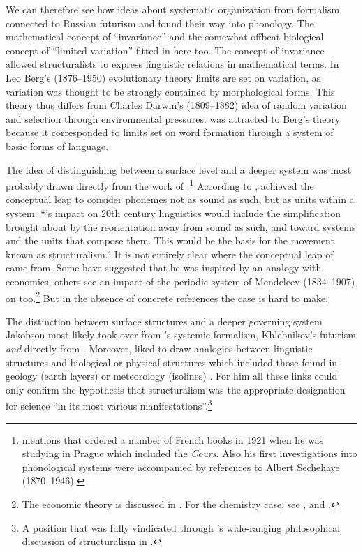 \documentclass[output=paper]{langscibook}
\begin{document}
We can therefore see how ideas about systematic organization from formalism connected to Russian futurism and found their way into  phonology. The mathematical concept of ``invariance'' and the somewhat offbeat biological concept of ``limited variation'' fitted in here too. The concept of invariance allowed structuralists to express linguistic relations in mathematical terms. In Leo Berg's (1876--1950) evolutionary theory limits are set on variation, as variation was thought to be strongly contained by morphological forms. This theory thus differs from Charles Darwin's (1809--1882) idea of random variation and selection through environmental pressures. {\Jakobson} was attracted to Berg's theory because it corresponded to limits set on word formation through a system of basic forms of language.

The idea of distinguishing between a surface level and a deeper system was most probably drawn directly from the work of {\Saussure}.\footnote{\citet[88--94]{Toman1995} mentions that {\Jakobson} ordered a number of French books in 1921 when he was studying in Prague which included the \emph{Cours}. Also his first investigations into phonological systems were accompanied by references to Albert Sechehaye (1870--1946).} According to \citet[237]{Joseph2010}, {\Saussure} achieved the conceptual leap to consider phonemes not as sound as such, but as units within a system: ``{\Saussure}'s impact on 20th century linguistics would include the simplification brought about by the reorientation away from sound as such, and toward systems and the units that compose them. This would be the basis for the movement known as structuralism.” It is not entirely clear where the conceptual leap of {\Saussure} came from. Some have suggested that he was inspired by an analogy with economics, others see an impact of the periodic system of Mendeleev (1834--1907) on {\Saussure} too.\footnote{The economic theory is discussed in \citet{Joseph2014}. For the chemistry case, see \citet{Culler1976}, \citet{Clark2008} and \citet{Silverstein2016}.} But in the absence of concrete references the case is hard to make. 


The distinction between surface structures and a deeper governing system Ja\-kob\-son most likely took over from {\Tynjanov}'s systemic formalism, Khleb\-ni\-kov's futurism \emph{and} directly from {\Saussure}.
Moreover, {\Jakobson} liked to draw analogies between linguistic structures and biological or physical structures which included those found in geology (earth layers) or meteorology (isolines) \citep[see][74--74, 188--194]{Holenstein1975}. For him all these links could only confirm the hypothesis that structuralism was the appropriate designation for science ``in its most various manifestations''.\footnote{A position that was fully vindicated through {\Cassirer}'s wide-ranging philosophical discussion of structuralism in \citet{Cassirer1945}.}  
\end{document}
